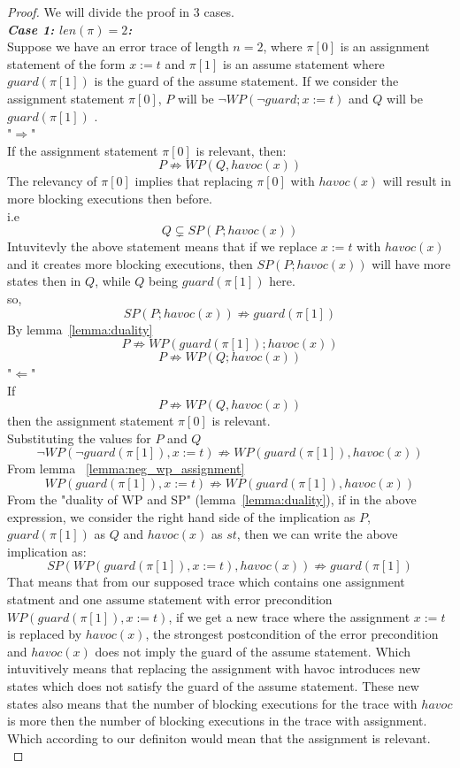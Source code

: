 \documentclass{article}
\newcommand{\limp}{\Rightarrow}
\begin{document}
\begin{proof}
We will divide the proof in 3 cases. \\
\textit{\textbf{Case 1: $len(\pi) = 2$:}} \\
Suppose we have an error trace of length $n=2$, where $\pi[0]$ is an assignment statement of the form $x:=t$ and $\pi[1]$ is an assume statement where $guard(\pi[1])$ is the guard of the assume statement. If we consider the assignment statement $\pi[0]$, $P$ will be $\neg WP(\neg guard; x:=t)$ and $Q$ will be $guard(\pi[1])$ .\\
"$\Rightarrow$"\\
If the assignment statement $\pi[0]$ is relevant, then: \\
 $$P \not \limp WP(Q,havoc(x))$$
 The relevancy of $\pi[0]$ implies that replacing $\pi[0]$ with $havoc(x)$ will result in more blocking executions then before.\\
 i.e
 $$Q \subsetneq SP(P; havoc(x))$$ 
 Intuvitevly the above statement means that if we replace $x:=t$ with $havoc(x)$ and it creates more blocking executions, then $SP(P; havoc(x))$ will have more states then in $Q$, while $Q$ being $guard(\pi[1])$ here. \\
so,
$$SP(P; havoc(x)) \not \limp guard(\pi[1])$$
By lemma~\ref{lemma:duality} 
$$P \not\limp WP(guard(\pi[1]); havoc(x))$$
$$P \not\limp WP(Q; havoc(x))$$
"$\Leftarrow$"\\
If
$$P \not \limp WP(Q, havoc(x))$$
then the assignment statement $\pi[0]$ is relevant.\\
Substituting the values for $P$ and $Q$
$$\neg WP(\neg guard(\pi[1]), x:=t) \not\limp WP(guard(\pi[1]), havoc(x))$$
From lemma ~\ref{lemma:neg_wp_assignment}
$$WP(guard(\pi[1]), x:=t) \not\limp WP(guard(\pi[1]), havoc(x))$$
From the "duality of WP and SP" (lemma~\ref{lemma:duality}), if in the above expression, we consider the right hand side of the implication as $P$, $guard(\pi[1])$ as $Q$ and $havoc(x)$ as $st$, then we can write the above implication as: \\
$$SP(WP(guard(\pi[1]), x:=t), havoc(x)) \not\limp guard(\pi[1])$$
That means that from our supposed trace which contains one assignment statment and one assume statement with error precondition $WP(guard(\pi[1]),x:=t)$, if we get a new trace where the assignment $x:=t$ is replaced by $havoc(x)$, the strongest postcondition of the error precondition and $havoc(x)$ does not imply the guard of the assume statement. Which intuvitively means that replacing the assignment with havoc introduces new states which does not satisfy the guard of the assume statement. These new states also means that the number of blocking executions for the trace with $havoc$ is more then the number of blocking executions in the trace with assignment. Which according to our definiton would mean that the assignment is relevant.\\

\end{proof}
\end{document}
